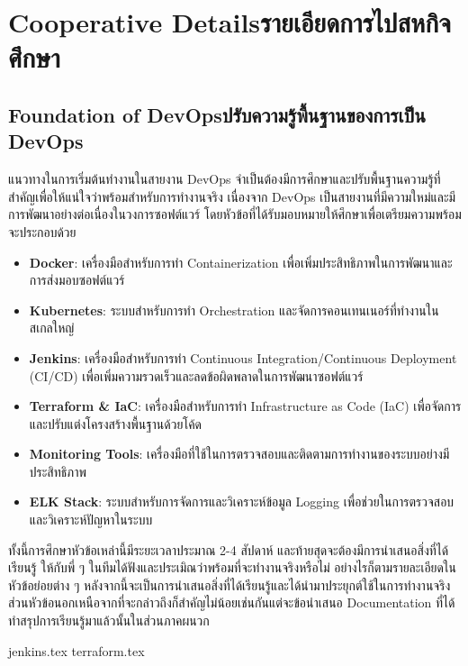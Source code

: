 \setcounter{secnumdepth}{3}

\chapter{\ifenglish Cooperative Details\else รายเอียดการไปสหกิจศึกษา\fi}


\section{\ifenglish Foundation of DevOps\else ปรับความรู้พื้นฐานของการเป็น DevOps\fi}
แนวทางในการเริ่มต้นทำงานในสายงาน DevOps จำเป็นต้องมีการศึกษาและปรับพื้นฐานความรู้ที่สำคัญเพื่อให้แน่ใจว่าพร้อมสำหรับการทำงานจริง
เนื่องจาก DevOps เป็นสายงานที่มีความใหม่และมีการพัฒนาอย่างต่อเนื่องในวงการซอฟต์แวร์ โดยหัวข้อที่ได้รับมอบหมายให้ศึกษาเพื่อเตรียมความพร้อมจะประกอบด้วย

\begin{itemize}
      \item \textbf{Docker}: เครื่องมือสำหรับการทำ Containerization เพื่อเพิ่มประสิทธิภาพในการพัฒนาและการส่งมอบซอฟต์แวร์
      \item \textbf{Kubernetes}: ระบบสำหรับการทำ Orchestration และจัดการคอนเทนเนอร์ที่ทำงานในสเกลใหญ่
      \item \textbf{Jenkins}: เครื่องมือสำหรับการทำ Continuous Integration/Continuous Deployment (CI/CD) เพื่อเพิ่มความรวดเร็วและลดข้อผิดพลาดในการพัฒนาซอฟต์แวร์
      \item \textbf{Terraform \& IaC}: เครื่องมือสำหรับการทำ Infrastructure as Code (IaC) เพื่อจัดการและปรับแต่งโครงสร้างพื้นฐานด้วยโค้ด
      \item \textbf{Monitoring Tools}: เครื่องมือที่ใช้ในการตรวจสอบและติดตามการทำงานของระบบอย่างมีประสิทธิภาพ
      \item \textbf{ELK Stack}: ระบบสำหรับการจัดการและวิเคราะห์ข้อมูล Logging เพื่อช่วยในการตรวจสอบและวิเคราะห์ปัญหาในระบบ
\end{itemize}

ทั้งนี้การศึกษาหัวข้อเหล่านี้มีระยะเวลาประมาณ 2-4 สัปดาห์ และท้ายสุดจะต้องมีการนำเสนอสิ่งที่ได้เรียนรู้
ให้กับพี่ ๆ ในทีมได้ฟังและประเมิณว่าพร้อมที่จะทำงานจริงหรือไม่ อย่างไรก็ตามรายละเอียดในหัวข้อย่อยต่าง ๆ หลังจากนี้จะเป็นการนำเสนอสิ่งที่ได้เรียนรู้และได้นำมาประยุกต์ใช้ในการทำงานจริง
ส่วนหัวข้อนอกเหนือจากที่จะกล่าวถึงก็สำคัญไม่น้อยเช่นกันแต่จะข้อนำเสนอ Documentation ที่ได้ทำสรุปการเรียนรู้มาแล้วนั้นในส่วนภาคผนวก

\clearpage
{jenkins.tex}
\clearpage
{terraform.tex}
\clearpage

